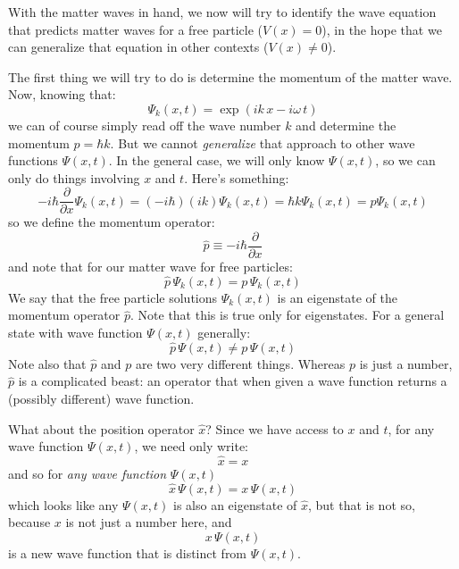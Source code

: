 \documentclass[12pt]{book}
\begin{document}
With the matter waves in hand, we now will try to identify the wave equation that predicts matter waves for a free particle ($V(x)=0$), in the hope that we can generalize that equation in other contexts ($V(x) \neq 0$).

The first thing we will try to do is determine the momentum of the matter wave.  Now, knowing that:
$$\Psi_k(x,t) = \exp(ik\,x-i \omega \, t)$$
we can of course simply read off the wave number $k$ and determine the momentum $p=\hbar k$.  But we cannot {\it generalize} that approach to other wave functions $\Psi(x,t)$.  In the general case, we will only know $\Psi(x,t)$, so we can only do things involving $x$ and $t$.  Here's something:
$$-i\hbar \frac{\partial}{\partial x} \Psi_k(x,t) = (-i \hbar) (ik) \Psi_k(x,t) = \hbar k \Psi_k(x,t) = p \Psi_k(x,t)$$
so we define the momentum operator:
\begin{equation}
\hat{p} \equiv -i \hbar \frac{\partial}{\partial x}
\end{equation}
and note that for our matter wave for free particles:
\begin{equation}
\hat{p} \, \Psi_k(x,t) = p \, \Psi_k(x,t)
\end{equation}
We say that the free particle solutions $\Psi_k(x,t)$ is an eigenstate of the momentum operator $\hat{p}$.  Note that this is true only for eigenstates.  For a general state with wave function $\Psi(x,t)$ generally:
$$\hat{p} \, \Psi(x,t) \neq p \, \Psi(x,t)$$
Note also that $\hat{p}$ and $p$ are two very different things.  Whereas $p$ is just a number, $\hat{p}$ is a complicated beast: an operator that when given a wave function returns a (possibly different) wave function.

What about the position operator $\hat{x}$?  Since we have access to $x$ and $t$, for any wave function $\Psi(x,t)$, we need only write:
\begin{equation}
\hat{x} = x
\end{equation}
and so for {\em any wave function} $\Psi(x,t)$
$$\hat{x} \, \Psi(x,t) = x \, \Psi(x,t)$$
which looks like any $\Psi(x,t)$ is also an eigenstate of $\hat{x}$, but that is not so, because $x$ is not just a number here, and 
$$x \, \Psi(x,t)$$
is a new wave function that is distinct from $\Psi(x,t)$.
\end{document}
